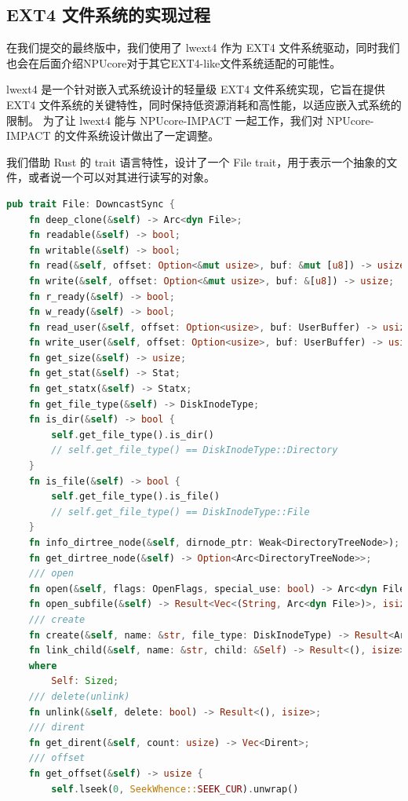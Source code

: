 
\subsection{EXT4 文件系统的实现过程}

在我们提交的最终版中，我们使用了 lwext4 作为 EXT4 文件系统驱动，同时我们也会在后面介绍NPUcore对于其它EXT4-like文件系统适配的可能性。

lwext4 是一个针对嵌入式系统设计的轻量级 EXT4 文件系统实现，它旨在提供 EXT4 文件系统的关键特性，同时保持低资源消耗和高性能，以适应嵌入式系统的限制。
为了让 lwext4 能与 NPUcore-IMPACT 一起工作，我们对 NPUcore-IMPACT 的文件系统设计做出了一定调整。

我们借助 Rust 的 trait 语言特性，设计了一个 File trait，用于表示一个抽象的文件，或者说一个可以对其进行读写的对象。

\begin{lstlisting}[language={Rust}, caption={File trait}]
pub trait File: DowncastSync {
    fn deep_clone(&self) -> Arc<dyn File>;
    fn readable(&self) -> bool;
    fn writable(&self) -> bool;
    fn read(&self, offset: Option<&mut usize>, buf: &mut [u8]) -> usize;
    fn write(&self, offset: Option<&mut usize>, buf: &[u8]) -> usize;
    fn r_ready(&self) -> bool;
    fn w_ready(&self) -> bool;
    fn read_user(&self, offset: Option<usize>, buf: UserBuffer) -> usize;
    fn write_user(&self, offset: Option<usize>, buf: UserBuffer) -> usize;
    fn get_size(&self) -> usize;
    fn get_stat(&self) -> Stat;
    fn get_statx(&self) -> Statx;
    fn get_file_type(&self) -> DiskInodeType;
    fn is_dir(&self) -> bool {
        self.get_file_type().is_dir()
        // self.get_file_type() == DiskInodeType::Directory
    }
    fn is_file(&self) -> bool {
        self.get_file_type().is_file()
        // self.get_file_type() == DiskInodeType::File
    }
    fn info_dirtree_node(&self, dirnode_ptr: Weak<DirectoryTreeNode>);
    fn get_dirtree_node(&self) -> Option<Arc<DirectoryTreeNode>>;
    /// open
    fn open(&self, flags: OpenFlags, special_use: bool) -> Arc<dyn File>;
    fn open_subfile(&self) -> Result<Vec<(String, Arc<dyn File>)>, isize>;
    /// create
    fn create(&self, name: &str, file_type: DiskInodeType) -> Result<Arc<dyn File>, isize>;
    fn link_child(&self, name: &str, child: &Self) -> Result<(), isize>
    where
        Self: Sized;
    /// delete(unlink)
    fn unlink(&self, delete: bool) -> Result<(), isize>;
    /// dirent
    fn get_dirent(&self, count: usize) -> Vec<Dirent>;
    /// offset
    fn get_offset(&self) -> usize {
        self.lseek(0, SeekWhence::SEEK_CUR).unwrap()

\end{lstlisting}
